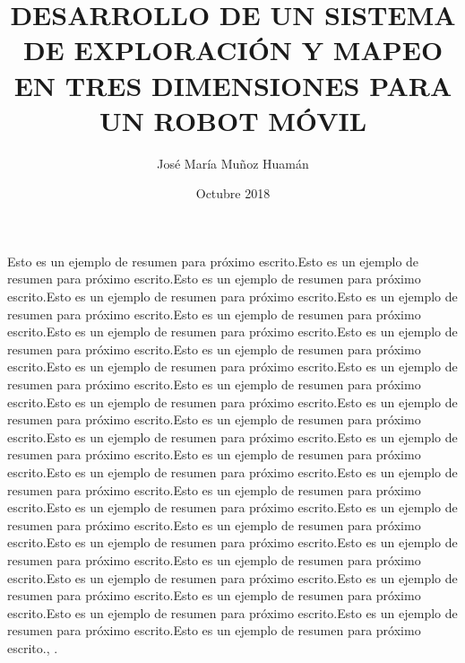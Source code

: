 \documentclass[a4paper, 12pt, oneside]{JMtesis}
\begin{document}
\frontmatter
{}
\title {DESARROLLO DE UN SISTEMA DE EXPLORACIÓN Y MAPEO EN TRES DIMENSIONES PARA UN ROBOT MÓVIL}
\author{Jos\'e Mar\'ia Muñoz Huam\'an}
\date{Octubre 2018}

\maketitle
{}

%
%
%

\tableofcontents
\resumen

Esto es un ejemplo de resumen para próximo escrito.Esto es un ejemplo de resumen para próximo escrito.Esto es un ejemplo de resumen para próximo escrito.Esto es un ejemplo de resumen para próximo escrito.Esto es un ejemplo de resumen para próximo escrito.Esto es un ejemplo de resumen para próximo escrito.Esto es un ejemplo de resumen para próximo escrito.Esto es un ejemplo de resumen para próximo escrito.Esto es un ejemplo de resumen para próximo escrito.Esto es un ejemplo de resumen para próximo escrito.Esto es un ejemplo de resumen para próximo escrito.Esto es un ejemplo de resumen para próximo escrito.Esto es un ejemplo de resumen para próximo escrito.Esto es un ejemplo de resumen para próximo escrito.Esto es un ejemplo de resumen para próximo escrito.Esto es un ejemplo de resumen para próximo escrito.Esto es un ejemplo de resumen para próximo escrito.Esto es un ejemplo de resumen para próximo escrito.Esto es un ejemplo de resumen para próximo escrito.Esto es un ejemplo de resumen para próximo escrito.Esto es un ejemplo de resumen para próximo escrito.Esto es un ejemplo de resumen para próximo escrito.Esto es un ejemplo de resumen para próximo escrito.Esto es un ejemplo de resumen para próximo escrito.Esto es un ejemplo de resumen para próximo escrito.Esto es un ejemplo de resumen para próximo escrito.Esto es un ejemplo de resumen para próximo escrito.Esto es un ejemplo de resumen para próximo escrito.Esto es un ejemplo de resumen para próximo escrito.Esto es un ejemplo de resumen para próximo escrito.Esto es un ejemplo de resumen para próximo escrito.Esto es un ejemplo de resumen para próximo escrito.Esto es un ejemplo de resumen para próximo escrito.\cite{kang20183d}, \cite{heng2018project}.
\end{document}
